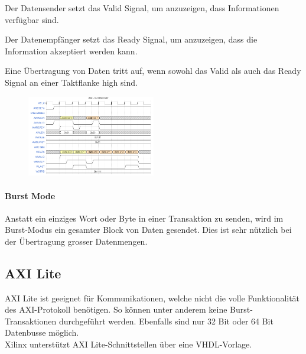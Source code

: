 \begin{compactenum}
    \item Der Datensender setzt das Valid Signal, um anzuzeigen, dass Informationen verfügbar sind.
    \item Der Datenempfänger setzt das Ready Signal, um anzuzeigen, dass die Information akzeptiert werden kann.
    \item Eine Übertragung von Daten tritt auf, wenn sowohl das Valid als auch das Ready Signal an einer Taktflanke high sind.
\end{compactenum}

\begin{multicols}{2}
    \begin{figure}[H]
     	\includegraphics[width=0.5\textwidth]{images/AXI_Burst_Transfer.png}
     \end{figure}
    \paragraph{Burst Mode}
    Anstatt ein einziges Wort oder Byte in einer Transaktion zu senden, wird  im Burst-Modus ein gesamter Block von Daten gesendet. Dies ist sehr nützlich bei der Übertragung grosser Datenmengen.
\end{multicols}

\subsection{AXI Lite}
AXI Lite ist geeignet für Kommunikationen, welche nicht die volle Funktionalität des AXI-Protokoll benötigen. So können unter anderem keine Burst-Transaktionen durchgeführt werden. Ebenfalls sind nur 32 Bit oder 64 Bit Datenbusse möglich.\\ Xilinx unterstützt AXI Lite-Schnittstellen über eine VHDL-Vorlage.
